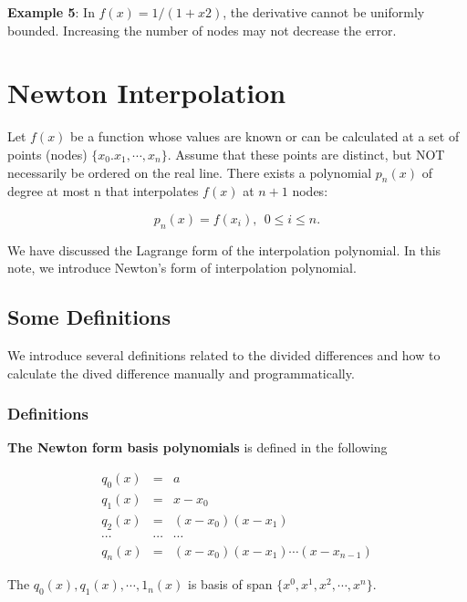 \documentclass[
]{book}
\begin{document}
\textbf{Example 5}: In \(f(x) = 1/ (1 + x2)\), the derivative cannot be uniformly bounded. Increasing the number of nodes may not decrease the error.

\hypertarget{newton-interpolation}{%
\chapter{Newton Interpolation}\label{newton-interpolation}}

Let \(f(x)\) be a function whose values are known or can be calculated at a set of points (nodes) \(\{ x_0. x_1, \cdots, x_n\}\). Assume that these points are distinct, but NOT necessarily be ordered on the real line. There exists a polynomial \(p_n(x)\) of degree at most n that interpolates \(f(x)\) at \(n+1\) nodes:

\[
p_n(x) = f(x_i), \ \ 0 \le i \le n.
\]

We have discussed the Lagrange form of the interpolation polynomial. In this note, we introduce Newton's form of interpolation polynomial.

\hfill\break

\hypertarget{some-definitions}{%
\section{Some Definitions}\label{some-definitions}}

We introduce several definitions related to the divided differences and how to calculate the dived difference manually and programmatically.

\hypertarget{definitions}{%
\subsection{Definitions}\label{definitions}}

\textbf{The Newton form basis polynomials} is defined in the following

\[
\begin{array}{lcl} 
q_0(x) & = & a \\ 
q_1(x) & = & x-x_0  \\
q_2(x) & = & (x-x_0)(x-x_1) \\
\cdots & \cdots & \cdots \\
q_n(x) & = & (x-x_0)(x-x_1)\cdots(x-x_{n-1})
\end{array}
\]

The \(q_0(x), q_1(x), \cdots, 1_n(x)\) is basis of span \(\{x^0, x^1, x^2, \cdots, x^n \}\).
\end{document}
